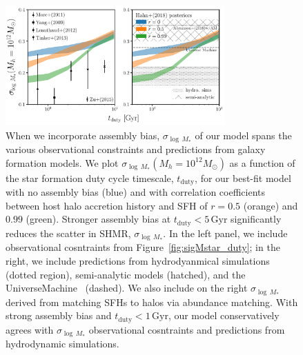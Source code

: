 \documentclass[12pt, letterpaper, preprint, tighten]{aastex62}
\begin{document}
\begin{figure}
\begin{center}
\includegraphics[width=0.75\textwidth]{figs/SHMRscatter_tduty_abias2.pdf}
    \caption{When we incorporate assembly bias, $\sigma_{\log\,M_*}$ of our 
    model spans the various observational constraints and predictions from 
    galaxy formation models. We plot $\sigma_{\log\,M_*}(M_h=10^{12}M_\odot)$ 
    as a function of the star formation duty cycle timescale, $t_\mathrm{duty}$,
    for our best-fit model with no assembly bias (blue) and with correlation 
    coefficients between host halo accretion history and SFH of $r{=}0.5$ 
    (orange) and $0.99$ (green).  Stronger assembly bias at 
    $t_\mathrm{duty}{<}5\,\mathrm{Gyr}$ significantly reduces the scatter 
    in SHMR, $\sigma_{\log\,M_*}$. In the left panel, we include observational 
    cosntraints from Figure~\ref{fig:sigMstar_duty}; in the right, we include 
    predictions from hydrodyanmical simulations (dotted region), semi-analytic
    models (hatched), and the {\sc UniverseMachine}~\citep{behroozi2018} 
    (dashed). We also include on the right $\sigma_{\log\,M_*}$ derived from 
    matching \cite{abramson2016} SFHs to halos via abundance matching.
    With strong assembly bias and $t_\mathrm{duty} < 1\,\mathrm{Gyr}$, our 
    model conservatively agrees with $\sigma_{\log\,M_*}$ observational 
    cosntraints and  predictions from hydrodynamic simulations. 
    }
\label{fig:sigMstar_duty_abias}
\end{center}
\end{figure}
\end{document}
